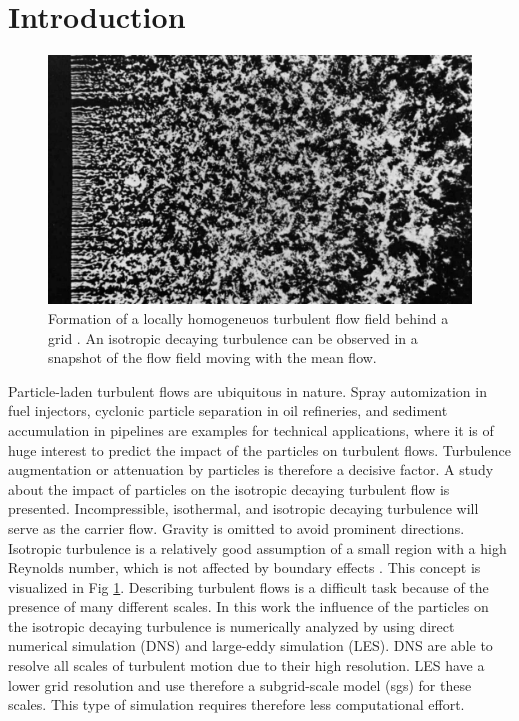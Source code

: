 \documentclass[11pt,a4paper,openany,oneside,parskip=half*]{article}
\begin{document}
\section{Introduction}
\setcounter{page}{1}
\begin{figure}[h]
	\centering
  \includegraphics[width=\textwidth]{./Abbildungen/TurbulentMotion_Introduction.png}
  \captionsetup{width=0.97\linewidth}
	\caption{Formation of a locally homogeneuos turbulent flow field behind a grid \cite{albumOfFluidMotion}. An isotropic decaying turbulence can be observed in a snapshot of the flow field moving with the mean flow.}
	\label{introduction_picture}
\end{figure}
Particle-laden turbulent flows are ubiquitous in nature.
Spray automization in fuel injectors, cyclonic particle separation in oil refineries, and sediment accumulation in pipelines are examples for technical applications, where it is of huge interest to predict the impact of the particles on turbulent flows.
Turbulence augmentation or attenuation by particles is therefore a decisive factor.
\newline
A study about the impact of particles on the isotropic decaying turbulent flow is presented.
Incompressible, isothermal, and isotropic decaying turbulence will serve as the carrier flow. Gravity is omitted to avoid prominent directions. Isotropic turbulence is a relatively good assumption of a small region with a high Reynolds number, which is not affected by boundary effects \cite{Kolmogorov1941}. This concept is visualized in Fig \ref{introduction_picture}. Describing turbulent flows is a difficult task because of the presence of many different scales.
\newline
In this work the influence of the particles on the isotropic decaying turbulence is numerically analyzed by using direct numerical simulation (DNS) and large-eddy simulation (LES). DNS are able to resolve all scales of turbulent motion due to their high resolution. LES have a lower grid resolution and use therefore a subgrid-scale model (sgs) for these scales. This type of simulation requires therefore less computational effort.
\end{document}
